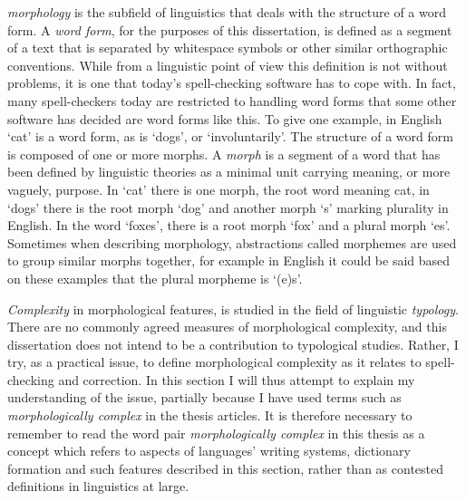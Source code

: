 \documentclass[officiallayout,final]{unihelcompling}
\begin{document}
\emph{\Gls{morphology}} is the subfield of linguistics that deals with the
structure of a word form. A \emph{\gls{word form}}, for the purposes of this
dissertation, is defined as a segment of a text that is separated by whitespace
symbols or other similar orthographic conventions. While from a linguistic
point of view this definition is not without problems, it is one that today's
spell-checking software has to cope with. In fact, many spell-checkers today
are restricted to handling word forms that some other software has decided are
word forms like this. To give one example, in English `cat' is a word form, as
is `dogs', or `involuntarily'. The structure of a word form is composed of one
or more morphs. A \emph{\gls{morph}} is a segment of a word that has been
defined by linguistic theories as a minimal unit carrying meaning, or more
vaguely, purpose. In `cat' there is one morph, the root word meaning cat, in
`dogs' there is the root morph `dog' and another morph `s' marking plurality in
English. In the word `foxes', there is a root morph `fox' and a plural morph
`es'. Sometimes when describing morphology, abstractions called
\glspl{morpheme} are used to group similar morphs together, for example in
English it could be said based on these examples that the plural morpheme is
`(e)s'.

\emph{Complexity} in morphological features, is studied in the field of
linguistic \emph{typology}. There are no commonly agreed measures of
morphological complexity, and this dissertation does not intend to be a
contribution to typological studies. Rather, I try, as a practical issue, to
define morphological complexity as it relates to spell-checking and correction.
In this section I will thus attempt to explain my understanding of the issue,
partially because I have used terms such as \emph{morphologically complex} in
the thesis articles. It is therefore necessary to remember to read the word
pair \emph{morphologically complex} in this thesis as a concept which refers to
aspects of languages' writing systems, dictionary formation and such features
described in this section, rather than as contested definitions in linguistics
at large.
\end{document}
